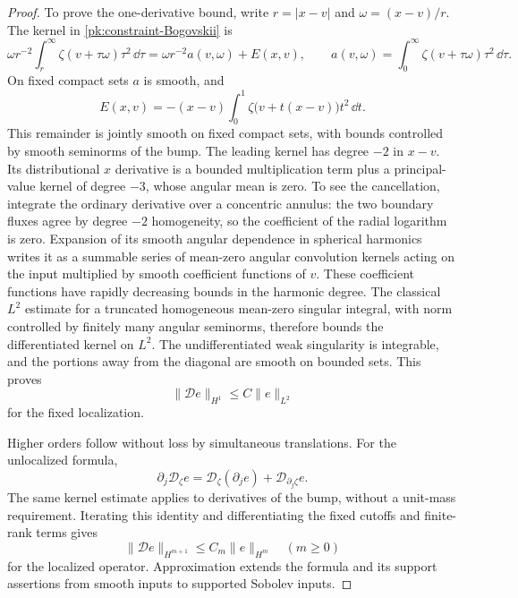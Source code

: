\begin{proof}
To prove the one-derivative bound, write \(r=|x-v|\) and
\(\omega=(x-v)/r\).  The kernel in
\eqref{pk:constraint-Bogovskii} is
\[
 \omega r^{-2}\int_r^\infty\zeta(v+\tau\omega)\tau^2\,\dd\tau
   =\omega r^{-2}a(v,\omega)+E(x,v),
 \qquad
 a(v,\omega)=\int_0^\infty\zeta(v+\tau\omega)\tau^2\,\dd\tau .
\]
On fixed compact sets \(a\) is smooth, and
\[
 E(x,v)
    =-(x-v)\int_0^1\zeta\bigl(v+t(x-v)\bigr)t^2\,\dd t.
\]
This remainder is jointly smooth on fixed compact sets, with bounds
controlled by smooth seminorms of the bump. The leading kernel has
degree \(-2\) in \(x-v\).  Its distributional \(x\) derivative is a
bounded multiplication term plus a principal-value kernel of degree
\(-3\), whose angular mean is zero.  To see the cancellation, integrate
the ordinary derivative over a concentric annulus: the two boundary
fluxes agree by degree \(-2\) homogeneity, so the coefficient of the
radial logarithm is zero.  Expansion of its smooth angular dependence
in spherical harmonics writes it as a summable series of mean-zero
angular convolution kernels acting on the input multiplied by smooth
coefficient functions of \(v\).  These coefficient functions have
rapidly decreasing bounds in the harmonic degree.  The classical
\(L^2\) estimate for a truncated homogeneous mean-zero singular
integral, with norm controlled by finitely many angular seminorms,
therefore bounds the differentiated kernel on \(L^2\).
The undifferentiated weak singularity is integrable, and the portions
away from the diagonal are smooth on bounded sets.  This proves
\[
 \|\mathcal D e\|_{H^1}\leq C\|e\|_{L^2}
\]
for the fixed localization.

Higher orders follow without loss by simultaneous translations.
For the unlocalized formula,
\[
 \partial_j\mathcal D_\zeta e
    =\mathcal D_\zeta(\partial_j e)
       +\mathcal D_{\partial_j\zeta}e.
\]
The same kernel estimate applies to derivatives of the bump, without
a unit-mass requirement.  Iterating this identity and differentiating
the fixed cutoffs and finite-rank terms gives
\begin{equation}
 \|\mathcal D e\|_{H^{m+1}}\leq C_m\|e\|_{H^m}
 \quad (m\geq0)
 \label{pk:constraint-divergence-bound}
\end{equation}
for the localized operator.  Approximation extends the formula and
its support assertions from smooth inputs to supported Sobolev inputs.


\end{proof}
